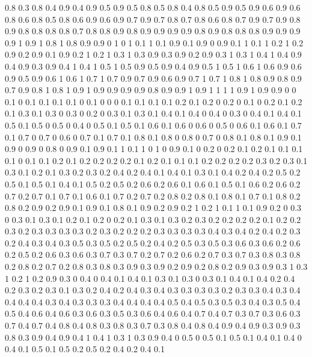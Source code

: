 0.8 0.3
0.8 0.4
0.9 0.4
0.9 0.5
0.9 0.5
0.8 0.5
0.8 0.4
0.8 0.5
0.9 0.5
0.9 0.6
0.9 0.6
0.8 0.6
0.8 0.5
0.8 0.6
0.9 0.6
0.9 0.7
0.9 0.7
0.8 0.7
0.8 0.6
0.8 0.7
0.9 0.7
0.9 0.8
0.9 0.8
0.8 0.8
0.8 0.7
0.8 0.8
0.9 0.8
0.9 0.9
0.9 0.9
0.8 0.9
0.8 0.8
0.8 0.9
0.9 0.9
0.9 1
0.9 1
0.8 1
0.8 0.9
0.9 0
1 0
1 0.1
1 0.1
0.9 0.1
0.9 0
0.9 0.1
1 0.1
1 0.2
1 0.2
0.9 0.2
0.9 0.1
0.9 0.2
1 0.2
1 0.3
1 0.3
0.9 0.3
0.9 0.2
0.9 0.3
1 0.3
1 0.4
1 0.4
0.9 0.4
0.9 0.3
0.9 0.4
1 0.4
1 0.5
1 0.5
0.9 0.5
0.9 0.4
0.9 0.5
1 0.5
1 0.6
1 0.6
0.9 0.6
0.9 0.5
0.9 0.6
1 0.6
1 0.7
1 0.7
0.9 0.7
0.9 0.6
0.9 0.7
1 0.7
1 0.8
1 0.8
0.9 0.8
0.9 0.7
0.9 0.8
1 0.8
1 0.9
1 0.9
0.9 0.9
0.9 0.8
0.9 0.9
1 0.9
1 1
1 1
0.9 1
0.9 0.9
0 0
0.1 0
0.1 0.1
0.1 0.1
0 0.1
0 0
0 0.1
0.1 0.1
0.1 0.2
0.1 0.2
0 0.2
0 0.1
0 0.2
0.1 0.2
0.1 0.3
0.1 0.3
0 0.3
0 0.2
0 0.3
0.1 0.3
0.1 0.4
0.1 0.4
0 0.4
0 0.3
0 0.4
0.1 0.4
0.1 0.5
0.1 0.5
0 0.5
0 0.4
0 0.5
0.1 0.5
0.1 0.6
0.1 0.6
0 0.6
0 0.5
0 0.6
0.1 0.6
0.1 0.7
0.1 0.7
0 0.7
0 0.6
0 0.7
0.1 0.7
0.1 0.8
0.1 0.8
0 0.8
0 0.7
0 0.8
0.1 0.8
0.1 0.9
0.1 0.9
0 0.9
0 0.8
0 0.9
0.1 0.9
0.1 1
0.1 1
0 1
0 0.9
0.1 0
0.2 0
0.2 0.1
0.2 0.1
0.1 0.1
0.1 0
0.1 0.1
0.2 0.1
0.2 0.2
0.2 0.2
0.1 0.2
0.1 0.1
0.1 0.2
0.2 0.2
0.2 0.3
0.2 0.3
0.1 0.3
0.1 0.2
0.1 0.3
0.2 0.3
0.2 0.4
0.2 0.4
0.1 0.4
0.1 0.3
0.1 0.4
0.2 0.4
0.2 0.5
0.2 0.5
0.1 0.5
0.1 0.4
0.1 0.5
0.2 0.5
0.2 0.6
0.2 0.6
0.1 0.6
0.1 0.5
0.1 0.6
0.2 0.6
0.2 0.7
0.2 0.7
0.1 0.7
0.1 0.6
0.1 0.7
0.2 0.7
0.2 0.8
0.2 0.8
0.1 0.8
0.1 0.7
0.1 0.8
0.2 0.8
0.2 0.9
0.2 0.9
0.1 0.9
0.1 0.8
0.1 0.9
0.2 0.9
0.2 1
0.2 1
0.1 1
0.1 0.9
0.2 0
0.3 0
0.3 0.1
0.3 0.1
0.2 0.1
0.2 0
0.2 0.1
0.3 0.1
0.3 0.2
0.3 0.2
0.2 0.2
0.2 0.1
0.2 0.2
0.3 0.2
0.3 0.3
0.3 0.3
0.2 0.3
0.2 0.2
0.2 0.3
0.3 0.3
0.3 0.4
0.3 0.4
0.2 0.4
0.2 0.3
0.2 0.4
0.3 0.4
0.3 0.5
0.3 0.5
0.2 0.5
0.2 0.4
0.2 0.5
0.3 0.5
0.3 0.6
0.3 0.6
0.2 0.6
0.2 0.5
0.2 0.6
0.3 0.6
0.3 0.7
0.3 0.7
0.2 0.7
0.2 0.6
0.2 0.7
0.3 0.7
0.3 0.8
0.3 0.8
0.2 0.8
0.2 0.7
0.2 0.8
0.3 0.8
0.3 0.9
0.3 0.9
0.2 0.9
0.2 0.8
0.2 0.9
0.3 0.9
0.3 1
0.3 1
0.2 1
0.2 0.9
0.3 0
0.4 0
0.4 0.1
0.4 0.1
0.3 0.1
0.3 0
0.3 0.1
0.4 0.1
0.4 0.2
0.4 0.2
0.3 0.2
0.3 0.1
0.3 0.2
0.4 0.2
0.4 0.3
0.4 0.3
0.3 0.3
0.3 0.2
0.3 0.3
0.4 0.3
0.4 0.4
0.4 0.4
0.3 0.4
0.3 0.3
0.3 0.4
0.4 0.4
0.4 0.5
0.4 0.5
0.3 0.5
0.3 0.4
0.3 0.5
0.4 0.5
0.4 0.6
0.4 0.6
0.3 0.6
0.3 0.5
0.3 0.6
0.4 0.6
0.4 0.7
0.4 0.7
0.3 0.7
0.3 0.6
0.3 0.7
0.4 0.7
0.4 0.8
0.4 0.8
0.3 0.8
0.3 0.7
0.3 0.8
0.4 0.8
0.4 0.9
0.4 0.9
0.3 0.9
0.3 0.8
0.3 0.9
0.4 0.9
0.4 1
0.4 1
0.3 1
0.3 0.9
0.4 0
0.5 0
0.5 0.1
0.5 0.1
0.4 0.1
0.4 0
0.4 0.1
0.5 0.1
0.5 0.2
0.5 0.2
0.4 0.2
0.4 0.1
